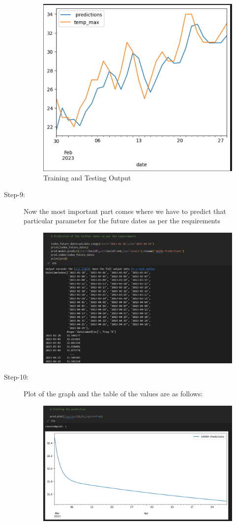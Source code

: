\begin{description}
\begin{figure}[hbt!]
  \centering \includegraphics[width=0.5\linewidth]{images/outputs/11.png}
  \caption{Training and Testing Output}
\end{figure}

\item[Step-9:] Now the most important part comes where we have to predict that particular parameter for the future dates as per the requirements

 \begin{figure}[hbt!]
  \centering
  \includegraphics[width=0.8\linewidth]{images/outputs/12.png}
\end{figure}
 

\item[Step-10:] Plot of the graph and the table of the values are as follows:
 \begin{figure}[hbt!]
  \centering
  \includegraphics[width=0.8\linewidth]{images/outputs/13.png}
\end{figure}
 
\end{description}
\pagebreak
